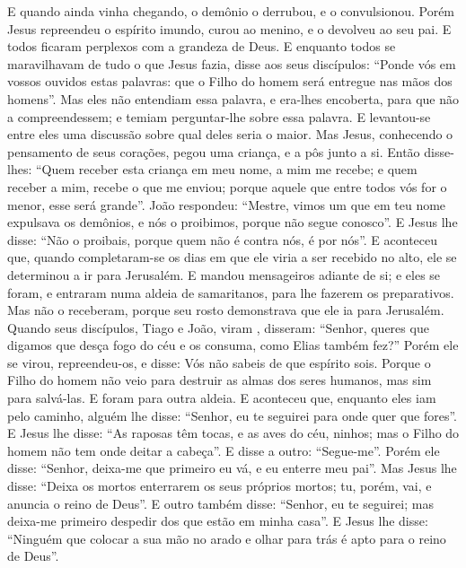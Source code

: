 {  E quando ainda vinha chegando, o demônio o derrubou, e o convulsionou. Porém Jesus repreendeu o espírito imundo, curou ao menino, e o devolveu ao seu pai.
  E todos ficaram perplexos com a grandeza de Deus. E enquanto todos se maravilhavam de tudo o que Jesus fazia, disse aos seus discípulos:
  “Ponde vós em vossos ouvidos estas palavras: que o Filho do homem será entregue nas mãos dos homens”.
  Mas eles não entendiam essa palavra, e era-lhes encoberta, para que não a compreendessem; e temiam perguntar-lhe sobre essa palavra.
  E levantou-se entre eles uma discussão sobre qual deles seria o maior.
  Mas Jesus, conhecendo o pensamento de seus corações, pegou uma criança, e a pôs junto a si.
  Então disse-lhes: “Quem receber esta criança em meu nome, a mim me recebe; e quem receber a mim, recebe o que me enviou; porque aquele que entre todos vós for o menor, esse será grande”.
  João respondeu: “Mestre, vimos um que em teu nome expulsava os demônios, e nós o proibimos, porque não segue conosco”.
  E Jesus lhe disse: “Não o proibais, porque quem não é contra nós, é por nós”.
  E aconteceu que, quando completaram-se os dias em que ele viria a ser recebido no alto, ele se determinou a ir para Jerusalém.
  E mandou mensageiros adiante de si;
 e eles se foram, e entraram numa aldeia de samaritanos, para lhe fazerem os preparativos.
  Mas não o receberam, porque seu rosto demonstrava que ele ia para Jerusalém.
  Quando seus discípulos, Tiago e João, viram
{},  disseram: “Senhor, queres que digamos que desça fogo do céu e os consuma, como Elias também fez?”
  Porém ele se virou, repreendeu-os, e disse: Vós não sabeis de que espírito sois.
  Porque o Filho do homem não veio para destruir as almas dos seres humanos, mas sim para salvá-las. E foram para outra aldeia.
  E aconteceu que, enquanto eles iam pelo caminho, alguém lhe disse: “Senhor, eu te seguirei para onde quer que fores”.
  E Jesus lhe disse: “As raposas têm tocas, e as aves do céu, ninhos; mas o Filho do homem não tem onde deitar a cabeça”.
  E disse a outro: “Segue-me”. Porém ele disse: “Senhor, deixa-me que primeiro eu vá, e eu enterre meu pai”.
  Mas Jesus lhe disse: “Deixa os mortos enterrarem os seus próprios mortos; tu, porém, vai, e anuncia o reino de Deus”.
  E outro também disse: “Senhor, eu te seguirei; mas deixa-me primeiro despedir dos que estão em minha casa”.
  E Jesus lhe disse: “Ninguém que colocar a sua mão no arado e olhar para trás é apto para o reino de Deus”.
\par }

